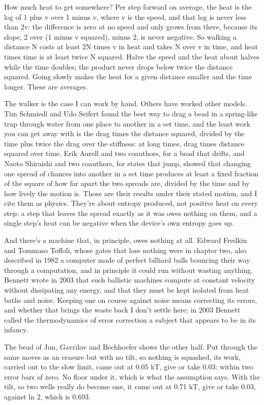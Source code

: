 \documentclass[11pt,twoside]{article}
\theoremstyle{thielethm}
\theoremstyle{thieledef}
\theoremstyle{thieledef}
\theoremstyle{thieledef}
\theoremstyle{thielethm}
\theoremstyle{thieleobs}
\theoremstyle{thielethm}
\begin{document}
How much heat to get somewhere? Per step forward on average, the heat is the log of 1 plus v over 1 minus v, where v is the speed, and that log is never less than 2v: the difference is zero at no speed and only grows from there, because its slope, 2 over (1 minus v squared), minus 2, is never negative. So walking a distance N costs at least 2N times v in heat and takes N over v in time, and heat times time is at least twice N squared. Halve the speed and the heat about halves while the time doubles; the product never drops below twice the distance squared. Going slowly makes the heat for a given distance smaller and the time longer. These are averages.

The walker is the case I can work by hand. Others have worked other models. Tim Schmiedl and Udo Seifert found the best way to drag a bead in a spring-like trap through water from one place to another in a set time, and the least work you can get away with is the drag times the distance squared, divided by the time plus twice the drag over the stiffness: at long times, drag times distance squared over time. Erik Aurell and two coauthors, for a bead that drifts, and Naoto Shiraishi and two coauthors, for states that jump, showed that changing one spread of chances into another in a set time produces at least a fixed fraction of the square of how far apart the two spreads are, divided by the time and by how lively the motion is. Those are their results under their stated motion, and I cite them as physics. They're about entropy produced, not positive heat on every step: a step that leaves the spread exactly as it was owes nothing on them, and a single step's heat can be negative when the device's own entropy goes up.

And there's a machine that, in principle, owes nothing at all. Edward Fredkin and Tommaso Toffoli, whose gates that lose nothing were in chapter two, also described in 1982 a computer made of perfect billiard balls bouncing their way through a computation, and in principle it could run without wasting anything. Bennett wrote in 2003 that such ballistic machines compute at constant velocity without dissipating any energy, and that they must be kept isolated from heat baths and noise. Keeping one on course against noise means correcting its errors, and whether that brings the waste back I don't settle here; in 2003 Bennett called the thermodynamics of error correction a subject that appears to be in its infancy.

The bead of Jun, Gavrilov and Bechhoefer shows the other half. Put through the same moves as an erasure but with no tilt, so nothing is squashed, its work, carried out to the slow limit, came out at 0.05 kT, give or take 0.03: within two error bars of zero. No floor under it, which is what the assumption says. With the tilt, so two wells really do become one, it came out at 0.71 kT, give or take 0.03, against ln 2, which is 0.693.
\end{document}
